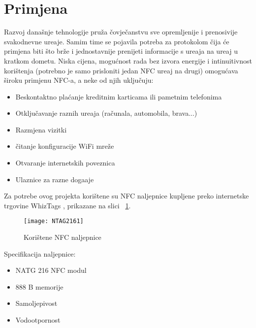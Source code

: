 \section{Primjena}

Razvoj dana\v{s}nje tehnologije pru\v{z}a \v{c}ovje\v{c}anstvu sve opremljenije i prenosivije svakodnevne ure\dj aje. Samim time se pojavila potreba za protokolom \v{c}ija \'{c}e primjena biti \v{s}to br\v{z}e i jednostavnije  prenijeti informacije s ure\dj aja na ure\dj aj u kratkom dometu. Niska cijena, mogu\'{c}nost rada bez izvora energije i intinuitivnost kori\v{s}tenja (potrebno je samo prisloniti jedan NFC ure\dj aj na drugi) omogu\'{c}ava \v{s}iroku primjenu NFC-a, a neke od njih uklju\v{c}uju:

\begin{itemize}
	\item Beskontaktno pla\'{c}anje kreditnim karticama ili pametnim telefonima
	\item Otklju\v{c}avanje raznih ure\dj aja (ra\v{c}unala, automobila, brava...)
	\item Razmjena vizitki
	\item \v{c}itanje konfiguracije WiFi mre\v{z}e
	\item Otvaranje internetskih poveznica
	\item Ulaznice za razne doga\dj aje
\end{itemize}

Za potrebe ovog projekta kori\v{s}tene su NFC naljepnice kupljene preko internetske trgovine WhizTags \cite{whiztags}, prikazane na slici  ~\ref{fig:whiztags}.

\begin{figure}[!htbp]
	\begin{center}
 \texttt{[image: NTAG2161]}
 \caption{Kori\v{s}tene NFC naljepnice}
 \label{fig:whiztags}
	\end{center}
\end{figure}

Specifikacija naljepnice:

\begin{itemize}
	\item NATG 216 NFC modul \cite{nat_modul}
	\item 888 B memorije
	\item Samoljepivost
	\item Vodootpornost
\end{itemize}